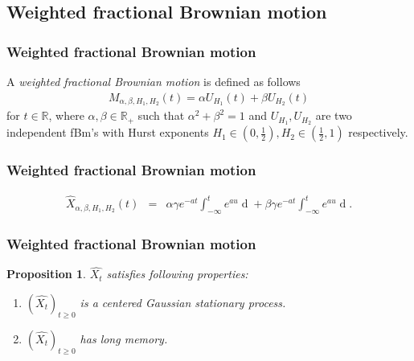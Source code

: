 \documentclass[]{beamer}
\newtheorem{proposition}{Proposition}
\begin{document}
\subsection{Weighted fractional Brownian motion}
\begin{frame}
\frametitle{Weighted fractional Brownian motion}
  \begin{definition}
  A \emph{weighted fractional Brownian motion} is defined as follows
\begin{eqnarray*}
  M_{\alpha,\beta,H_1,H_2}(t) = \alpha U_{H_1}(t) + \beta U_{H_2}(t)
  \label{sec:mfsv}
\end{eqnarray*}
for $t\in \mathbb{R}$, where $\alpha, \beta \in \mathbb{R}_+$ such that $\alpha^2 + \beta^2 =1$ and $U_{H_1}, U_{H_2}$ are two independent fBm's with Hurst exponents $H_1 \in (0, \frac{1}{2}), H_2 \in (\frac{1}{2}, 1)$ respectively.
\end{definition}
\end{frame}

\begin{frame}
  \frametitle{Weighted fractional Brownian motion}
\begin{eqnarray*}
  \hat{X}_{\alpha,\beta,H_1,H_2}(t) &=&  \alpha \gamma e^{-at}\int_{-\infty}^t e^{au} \mathop{d U_{H_1}} + \beta \gamma e^{-at}\int_{-\infty}^t e^{au} \mathop{d U_{H_2}}.
  \label{sec:jjj}
\end{eqnarray*}
\end{frame}

\begin{frame}
  \frametitle{Weighted fractional Brownian motion}
  \begin{proposition}
  $\hat{X_t}$ satisfies following properties:
\begin{enumerate}[topsep=0pt, itemsep=-1ex, partopsep=1ex, parsep=1ex, label=(\roman*)]
  \item $(\hat{X_t})_{t\ge 0}$ is a centered Gaussian stationary process.
  \item $(\hat{X_t})_{t\ge 0}$ has long memory.
  \end{enumerate}
\end{proposition}
\end{frame}
\end{document}
